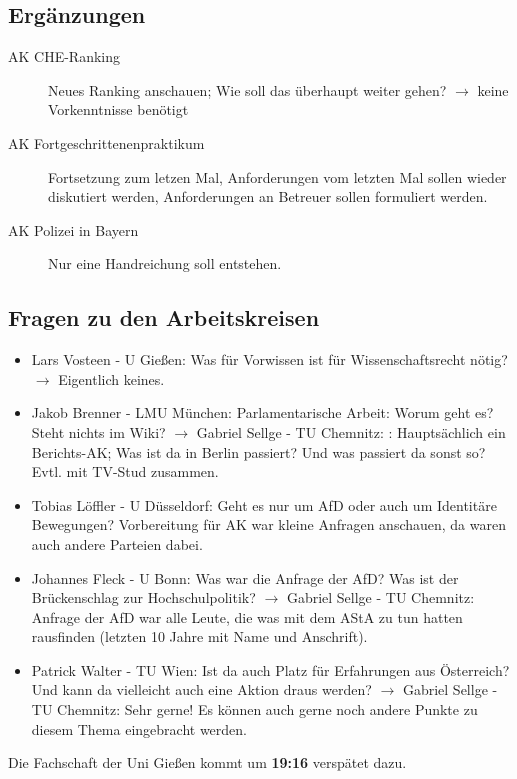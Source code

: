   \subsection{Ergänzungen}
    \begin{description}
      \item[AK CHE-Ranking] Neues Ranking anschauen; Wie soll das überhaupt weiter gehen? $\rightarrow$ keine Vorkenntnisse benötigt
      \item[AK Fortgeschrittenenpraktikum] Fortsetzung zum letzen Mal, Anforderungen vom letzten Mal sollen wieder diskutiert werden, Anforderungen an Betreuer sollen formuliert werden.
      \item[AK Polizei in Bayern] Nur eine Handreichung soll entstehen.
    \end{description}

  \subsection{Fragen zu den Arbeitskreisen}
    \begin{itemize}
      \item Lars Vosteen - U Gießen:  Was für Vorwissen ist für Wissenschaftsrecht nötig? $\rightarrow$ Eigentlich keines.
      \item Jakob Brenner - LMU München:  Parlamentarische Arbeit: Worum geht es? Steht nichts im Wiki? $\rightarrow$ Gabriel Sellge - TU Chemnitz: : Hauptsächlich ein Berichts-AK; Was ist da in Berlin passiert? Und was passiert da sonst so? Evtl. mit TV-Stud zusammen.
      \item Tobias Löffler - U Düsseldorf:  Geht es nur um AfD oder auch um Identitäre Bewegungen? Vorbereitung für AK war kleine Anfragen anschauen, da waren auch andere Parteien dabei.
      \item Johannes Fleck - U Bonn:  Was war die Anfrage der AfD? Was ist der Brückenschlag zur Hochschulpolitik? $\rightarrow$ Gabriel Sellge - TU Chemnitz:  Anfrage der AfD war alle Leute, die was mit dem AStA zu tun hatten rausfinden (letzten 10 Jahre mit Name und Anschrift).
      \item Patrick Walter - TU Wien:  Ist da auch Platz für Erfahrungen aus Österreich? Und kann da vielleicht auch eine Aktion draus werden? $\rightarrow$ Gabriel Sellge - TU Chemnitz:  Sehr gerne! Es können auch gerne noch andere Punkte zu diesem Thema eingebracht werden.
    \end{itemize}

    \begin{info}{}
      Die Fachschaft der Uni Gießen kommt um \textbf{19:16} verspätet dazu.
    \end{info}

